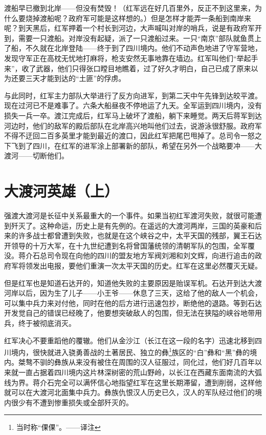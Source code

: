 \documentclass[10pt]{book}
\begin{document}
渡船早已撤到北岸——但没有焚毁！（红军远在好几百里外，反正不到这里来，为什么要烧掉渡船呢？政府军可能是这样想的。）但是怎样才能弄一条船到南岸来呢？到天黑后，红军押着一个村长到河边，大声喊叫对岸的哨兵，说是有政府军开到，需要一只渡船。对岸没有起疑，派了一只渡船过来。一只“南京”部队就鱼贯上了船，不久就在北岸登陆——终于到了四川境内。他们不动声色地进了守军营地，发现守军正在高枕无忧地打麻将，枪支安然无事地靠在墙边。红军叫他们“举起手来”，收了武器，他们只得张口瞠目地瞧着，过了好久才明白，自己已成了原来以为还要三天才能到达的“土匪”的俘虏。

与此同时，红军主力部队大举进行了反方向进军，到第二天中午先锋到达皎平渡。现在过河已不是难事了。六条大船昼夜不停地运了九天。全军运到四川境内，没有损失一兵一卒。渡江完成后，红军马上破坏了渡船，躺下来睡觉。两天后蒋军到达河边时，他们的敌军的殿后部队在北岸高兴地叫他们过去，说游泳很舒服。政府军不得不迂回二百多英里才能到最近的渡口，因此红军把尾巴甩掉了。总司令一怒之下飞到了四川，在红军的进军涂上部署新的部队，希望在另外一个战略要冲——大渡河——切断他们。



\section{大渡河英雄（上）}

强渡大渡河是长征中关系最重大的一个事件。如果当初红军渡河失败，就很可能遭到歼灭了。这种命运，历史上是有先例的。在遥远的大渡河两岸，三国的英豪和后来的许多战士都曾遭到失败，也就是在这个峡谷之中，太平天国的残部，翼王石达开领导的十万大军，在十九世纪遭到名将曾国藩统领的清朝军队的包围，全军覆没。蒋介石总司令现在向他的四川的盟友地方军阀刘湘和刘文辉，向进行追击的政府军将领发出电报，要他们重演一次太平天国的历史。红军在这里必然覆灭无疑。

但是红军也是知道石达开的，知道他失败的主要原因是贻误军机。石达开到达大渡河岸以后，因为生了儿子——小王爷——休息了三天，这给了他的敌人一个机会，可以集中兵力来对付他，同时在他的后方进行迅速包抄，断绝他的退路。等到石达开发觉自己的错误已经晚了，他要想突破敌人的包围，但无法在狭隘的峡谷地带用兵，终于被彻底消灭。

红军决心不要重蹈他的覆辙。他们从金沙江（长江在这一段的名字）迅速北移到四川境内，很快就进入骁勇善战的土著居民、独立的彝\footnote{当时称“倮倮”。——译注}族区的“白”彝和“黑”彝的境内。桀骜不驯的彝族从来没有被住在周围的汉人征服过，同化过，他们好几百年以来就一直占据着四川境内这片林深树密的荒山野岭，以长江在西藏东面南流的大弧线为界。蒋介石完全可以满怀信心地指望红军在这里长期滞留，遭到削弱，这样他就可以在大渡河北面集中兵力。彝族仇恨汉人历史已久，汉人的军队经过他们的境内很少有不遭到惨重损失或全部歼灭的。
\end{document}

